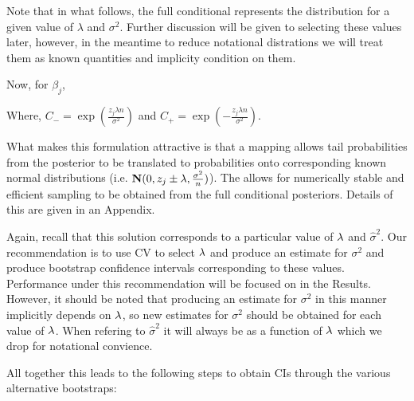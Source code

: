 Note that in what follows, the full conditional represents the distribution for a given value of $\lambda$ and $\sigma^2$. Further discussion will be given to selecting these values later, however, in the meantime to reduce notational distrations we will treat them as known quantities and implicity condition on them.

Now, for $\beta_j$,


Where, $C_{-} = \exp(\frac{z_j \lambda n}{\sigma^2})$ and $C_{+} = \exp(-\frac{z_j \lambda n}{\sigma^2})$.

What makes this formulation attractive is that a mapping allows tail probabilities from the posterior to be translated to probabilities onto corresponding known normal distributions (i.e. $\mathbf{N}(0, z_j \pm \lambda, \frac{\sigma^2}{n})$). The allows for numerically stable and efficient sampling to be obtained from the full conditional posteriors. Details of this are given in an Appendix.

Again, recall that this solution corresponds to a particular value of $\lambda$ and $\hat{\sigma}^2$. Our recommendation is to use CV to select $\lambda$ and produce an estimate for $\sigma^2$ and produce bootstrap confidence intervals corresponding to these values. Performance under this recommendation will be focused on in the Results. However, it should be noted that producing an estimate for $\sigma^2$ in this manner implicitly depends on $\lambda$, so new estimates for $\sigma^2$ should be obtained for each value of $\lambda$. When refering to $\hat{\sigma}^2$ it will always be as a function of $\lambda$ which we drop for notational convience.

All together this leads to the following steps to obtain CIs through the various alternative bootstraps:


